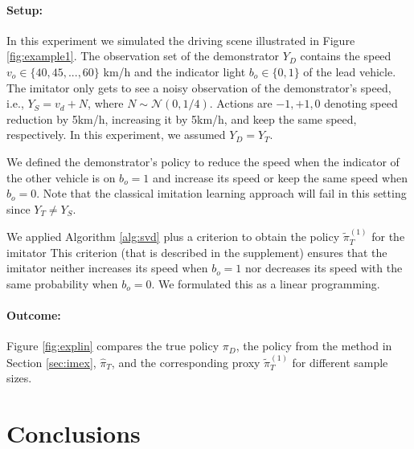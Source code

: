 \documentclass[letterpaper]{article} %
\theoremstyle{definition}%
\theoremstyle{definition}
\newcommand{\Obs}{Y}
\newcommand{\todo}[1]{\textcolor{red}{#1}}
\begin{document}
\paragraph{Setup:}
In this experiment we simulated the driving scene illustrated in Figure \ref{fig:example1}. The observation set of the demonstrator $\Obs_D$ contains the speed $v_o\in\{40, 45, ...,60\}$ km/h and the indicator light $b_o\in\{0,1\}$ of the lead vehicle. The imitator only gets to see a noisy observation of the demonstrator's speed, i.e., $\Obs_S= v_d + N$, where $N\sim\mathcal{N}(0,1/4)$.  Actions are $-1, +1, 0$ denoting speed reduction by 5km/h, increasing it by 5km/h, and keep the same speed, respectively. In this experiment, we assumed $\Obs_D=\Obs_T$.

We defined the demonstrator's policy to reduce the speed when the indicator of the other vehicle is on $b_o=1$ and increase its speed or keep the same speed when $b_o=0$.
Note that the classical imitation learning approach will fail in this setting since $\Obs_T\neq\Obs_S$.

We applied Algorithm \ref{alg:svd} plus a criterion to obtain the policy $\tilde{\pi}_T^{(1)}$ for the imitator
This criterion (that is described in the supplement) ensures that the imitator neither increases its speed when $b_o=1$ nor decreases its speed with the same probability when $b_o=0$. We formulated this as a linear programming.

\paragraph{Outcome:}

Figure \ref{fig:explin} compares the true policy $\pi_D$, the policy from the method in Section \ref{sec:imex}, $\hat{\pi}_T$, and the corresponding proxy $\tilde{\pi}^{(1)}_T$ for different sample sizes.




\section{Conclusions}
\end{document}
